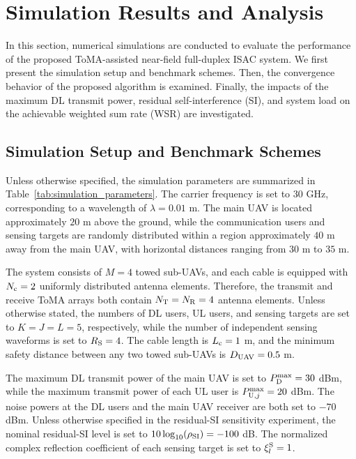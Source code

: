 \documentclass[letterpaper,journal]{IEEEtran}
\begin{document}
\section{Simulation Results and Analysis}
\label{sec:simulation}

In this section, numerical simulations are conducted to evaluate the
performance of the proposed ToMA-assisted near-field full-duplex ISAC
system. We first present the simulation setup and benchmark schemes.
Then, the convergence behavior of the proposed algorithm is examined.
Finally, the impacts of the maximum DL transmit power, residual
self-interference (SI), and system load on the achievable weighted sum
rate (WSR) are investigated.

\subsection{Simulation Setup and Benchmark Schemes}
\label{subsec:simulation_setup}

Unless otherwise specified, the simulation parameters are summarized in
Table~\ref{tab:simulation_parameters}. The carrier frequency is set to
$30$ GHz, corresponding to a wavelength of $\lambda=0.01$ m. The main
UAV is located approximately $20$ m above the ground, while the
communication users and sensing targets are randomly distributed within
a region approximately $40$ m away from the main UAV, with horizontal
distances ranging from $30$ m to $35$ m.

The system consists of $M=4$ towed sub-UAVs, and each cable is equipped
with $N_{\rm c}=2$ uniformly distributed antenna elements. Therefore,
the transmit and receive ToMA arrays both contain
$N_{\rm T}=N_{\rm R}=4$ antenna elements. Unless otherwise stated, the
numbers of DL users, UL users, and sensing targets are set to
$K=J=L=5$, respectively, while the number of independent sensing
waveforms is set to $R_{\rm S}=4$. The cable length is
$L_{\rm c}=1$ m, and the minimum safety distance between any two towed
sub-UAVs is $D_{\rm UAV}=0.5$ m.

The maximum DL transmit power of the main UAV is set to
$P_{\rm D}^{\max}=30$ dBm, while the maximum transmit power of each UL
user is $P_{{\rm U},j}^{\max}=20$ dBm. The noise powers at the DL users
and the main UAV receiver are both set to $-70$ dBm. Unless otherwise
specified in the residual-SI sensitivity experiment, the nominal
residual-SI level is set to
$10\log_{10}(\rho_{\rm SI})=-100$ dB. The normalized complex reflection
coefficient of each sensing target is set to $\xi_l^{\rm S}=1$.
\end{document}
